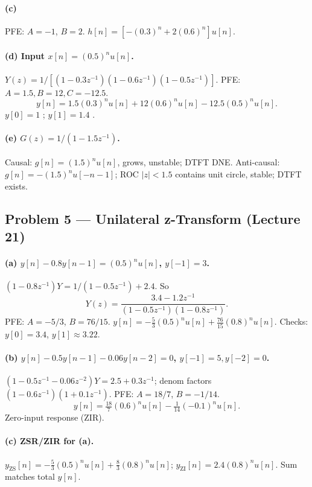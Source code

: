 \documentclass[11pt]{article}
\begin{document}
\paragraph{(c)} PFE: $A=-1$, $B=2$. $h[n] = [-(0.3)^n + 2(0.6)^n]u[n]$.

\paragraph{(d) Input $x[n] = (0.5)^n u[n]$.} $Y(z) = 1/[(1-0.3z^{-1})(1-0.6z^{-1})(1-0.5z^{-1})]$. PFE: $A=1.5, B=12, C=-12.5$.
\[
y[n] = 1.5(0.3)^n u[n] + 12(0.6)^n u[n] - 12.5(0.5)^n u[n].
\]
$y[0] = 1$ \checkmark; $y[1] = 1.4$ \checkmark.

\paragraph{(e) $G(z) = 1/(1-1.5 z^{-1})$.}
Causal: $g[n] = (1.5)^n u[n]$, grows, unstable; DTFT DNE.
Anti-causal: $g[n] = -(1.5)^n u[-n-1]$; ROC $|z|<1.5$ contains unit circle, stable; DTFT exists.

\subsection{Problem 5 --- Unilateral z-Transform (Lecture 21)}

\paragraph{(a) $y[n]-0.8 y[n-1] = (0.5)^n u[n]$, $y[-1]=3$.}
$(1-0.8 z^{-1})Y = 1/(1-0.5 z^{-1}) + 2.4$. So
\[
Y(z) = \frac{3.4 - 1.2 z^{-1}}{(1-0.5 z^{-1})(1-0.8 z^{-1})}.
\]
PFE: $A = -5/3$, $B = 76/15$. $y[n] = -\tfrac{5}{3}(0.5)^n u[n] + \tfrac{76}{15}(0.8)^n u[n]$. Checks: $y[0] = 3.4$, $y[1]\approx 3.22$.

\paragraph{(b) $y[n]-0.5y[n-1]-0.06y[n-2]=0$, $y[-1]=5, y[-2]=0$.}
$(1-0.5 z^{-1}-0.06 z^{-2})Y = 2.5 + 0.3 z^{-1}$; denom factors $(1-0.6z^{-1})(1+0.1 z^{-1})$. PFE: $A = 18/7$, $B = -1/14$.
\[
y[n] = \tfrac{18}{7}(0.6)^n u[n] - \tfrac{1}{14}(-0.1)^n u[n].
\]
Zero-input response (ZIR).

\paragraph{(c) ZSR/ZIR for (a).}
$y_{\text{ZS}}[n] = -\tfrac{5}{3}(0.5)^n u[n] + \tfrac{8}{3}(0.8)^n u[n]$; $y_{\text{ZI}}[n] = 2.4(0.8)^n u[n]$. Sum matches total $y[n]$.
\end{document}
